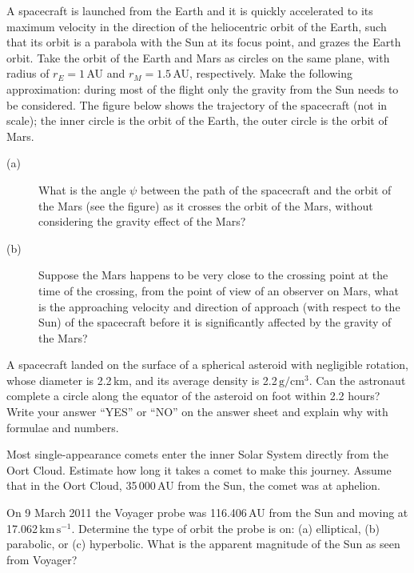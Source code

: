 A spacecraft is launched from the Earth and it is quickly accelerated to its
maximum velocity in the direction of the heliocentric orbit of the Earth, such
that its orbit is a parabola with the Sun at its focus point, and grazes the
Earth orbit. Take the orbit of the Earth and Mars as circles on the same plane,
with radius of $r_E = 1$\,AU and $r_M = 1.5$\,AU, respectively. Make the
following approximation: during most of the flight only the gravity from the
Sun needs to be considered. The figure below shows the trajectory of the
spacecraft (not in scale); the inner circle is the orbit of the Earth, the
outer circle is the orbit of Mars.


\begin{description}
\item[(a)] What is the angle $\psi$ between the path of the spacecraft and the
  orbit of the Mars (see the figure) as it crosses the orbit of the Mars,
  without considering the gravity effect of the Mars?
\item[(b)] Suppose the Mars happens to be very close to the crossing point at
  the time of the crossing, from the point of view of an observer on Mars, what
  is the approaching velocity and direction of approach (with respect to the
  Sun) of the spacecraft before it is significantly affected by the gravity of
  the Mars?
\end{description}

A spacecraft landed on the surface of a spherical asteroid with negligible
rotation, whose diameter is 2.2\,km, and its average density is
2.2\,$\mathrm{g/cm^3}$. Can the astronaut complete a circle along the equator
of the asteroid on foot within 2.2 hours? Write your answer ``YES'' or ``NO''
on the answer sheet and explain why with formulae and numbers.

Most single-appearance comets enter the inner Solar System directly from the
Oort Cloud. Estimate how long it takes a comet to make this journey. Assume
that in the Oort Cloud, 35\,000\,AU from the Sun, the comet was at aphelion.

On 9 March 2011 the Voyager probe was 116.406\,AU from the Sun and moving at
17.062\,$\mathrm{km\,s^{-1}}$. Determine the type of orbit the probe is on:
(a) elliptical, (b) parabolic, or (c) hyperbolic. What is the apparent
magnitude of the Sun as seen from Voyager?

